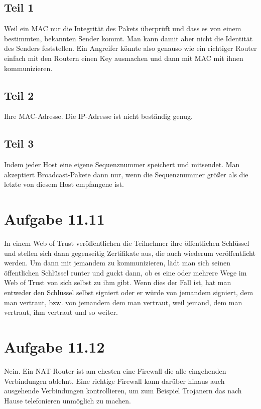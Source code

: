 \documentclass[10pt,a4paper]{article}
\begin{document}
\subsection{Teil 1}

Weil ein MAC nur die Integrität des Pakets überprüft und dass es von einem
bestimmten, bekannten Sender kommt. Man kann damit aber nicht die Identität des
Senders feststellen. Ein Angreifer könnte also genauso wie ein richtiger Router
einfach mit den Routern einen Key ausmachen und dann mit MAC mit ihnen
kommunizieren.

\subsection{Teil 2}

Ihre MAC-Adresse. Die IP-Adresse ist nicht beständig genug.

\subsection{Teil 3}

Indem jeder Host eine eigene Sequenznummer speichert und mitsendet. Man
akzeptiert Broadcast-Pakete dann nur, wenn die Sequenznummer größer als die
letzte von diesem Host empfangene ist.

\section{Aufgabe 11.11}

In einem Web of Trust veröffentlichen die Teilnehmer ihre öffentlichen Schlüssel
und stellen sich dann gegenseitig Zertifikate aus, die auch wiederum
veröffentlicht werden. Um dann mit jemandem zu kommunizieren, lädt man sich
seinen öffentlichen Schlüssel runter und guckt dann, ob es eine oder mehrere
Wege im Web of Trust von sich selbst zu ihm gibt. Wenn dies der Fall ist, hat
man entweder den Schlüssel selbst signiert oder er würde von jemandem signiert,
dem man vertraut, bzw. von jemandem dem man vertraut, weil jemand, dem man
vertraut, ihm vertraut und so weiter.

\section{Aufgabe 11.12}

Nein. Ein NAT-Router ist am ehesten eine Firewall die alle eingehenden
Verbindungen ablehnt. Eine richtige Firewall kann darüber hinaus auch ausgehende
Verbindungen kontrollieren, um zum Beispiel Trojanern das nach Hause
telefonieren unmöglich zu machen.
\end{document}
